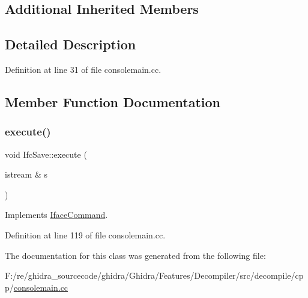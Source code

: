 \subsection*{Additional Inherited Members}


\subsection{Detailed Description}


Definition at line 31 of file consolemain.\+cc.



\subsection{Member Function Documentation}
\mbox{\label{class_ifc_save_a56ac19bca1d3b3cff186db25db549a6d}} 
\subsubsection{\texorpdfstring{execute()}{execute()}}
{\footnotesize\ttfamily void Ifc\+Save\+::execute (\begin{DoxyParamCaption}\item[{istream \&}]{s }\end{DoxyParamCaption})\hspace{0.3cm}{\ttfamily [virtual]}}



Implements \mbox{\hyperlink{class_iface_command_af10e29cee2c8e419de6efe9e680ad201}{Iface\+Command}}.



Definition at line 119 of file consolemain.\+cc.



The documentation for this class was generated from the following file\+:\begin{DoxyCompactItemize}
\item 
F\+:/re/ghidra\+\_\+sourcecode/ghidra/\+Ghidra/\+Features/\+Decompiler/src/decompile/cpp/\mbox{\hyperlink{consolemain_8cc}{consolemain.\+cc}}\end{DoxyCompactItemize}
